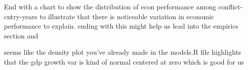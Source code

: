 
End with a chart to show the distribution of econ performance among conflict-cntry-years to illustrate that there is noticeable variation in economic performance to explain. ending with this might help us lead into the empirics section and 

	seems like the density plot you've already made in the models.R file highlights that the gdp growth var is kind of normal centered at zero which is good for us	